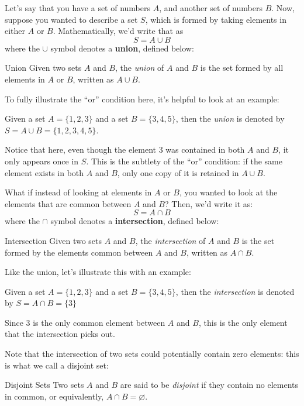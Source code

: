 Let's say that you have a set of numbers \( A  \), and another set of numbers \( B \).
Now, suppose you wanted to describe a set \( S \), which is formed by taking elements in either \( A \) or 
\( B \). Mathematically, we'd write that as
\[
S = A \cup B
\] 
where the \( \cup \) symbol denotes a \textbf{union}, defined below:
\begin{definition}{Union}{}
	Given two sets \( A \) and \( B \), the \textit{union} of \( A \) and \( B \) is the 
	set formed by all elements in \( A \) or \( B \), written as \( A \cup B \). 
\end{definition}
To fully illustrate the ``or'' condition here, it's helpful to look at an example:
\begin{example}{}{}
	Given a set \( A = \{1, 2, 3\}  \) and a set \( B = \{3, 4, 5\}  \), then the \textit{union} 
	is denoted by \( S = A \cup B = \{1, 2, 3, 4, 5\}  \).  

	Notice that here, even though the element 3 was contained in both \( A \) and \( B \), it only appears
	once in \( S \). This is the subtlety of the ``or'' condition: if the same element exists in both \( A \)
	and \( B \), only one copy of it is retained in \( A \cup B \). 
\end{example}
What if instead of looking at elements in \( A \) or \( B \), you wanted to look at the elements that are common 
between \( A \) and \( B \)? Then, we'd write it as:
\[
S = A \cap B
\] 
where the \( \cap \) symbol denotes a \textbf{intersection}, defined below:
\begin{definition}{Intersection}{}
	Given two sets \( A \) and \( B \), the \textit{intersection} of \( A \) and \( B \) 
	is the set formed by the elements common between \( A \) and \( B \), written as \( A \cap B \). 
\end{definition}
Like the union, let's illustrate this with an example:
\begin{example}{}{}
	Given a set \( A = \{1, 2, 3\}  \) and a set \( B = \{3, 4, 5\}  \), then the \textit{intersection}
	is denoted by \( S = A \cap B = \{3\}  \)

	Since 3 is the only common element between  \( A \) and \( B \), this is the only element that the 
	intersection picks out. 
\end{example}
Note that the intersection of two sets could potentially contain zero elements: this is what we call a 
disjoint set:
\begin{definition}{Disjoint Sets}{}
	Two sets \( A \) and \( B \) are said to be \textit{disjoint} if they contain no elements in common, or 
	equivalently, \( A \cap B = \varnothing \).
\end{definition}
